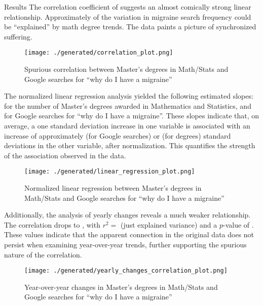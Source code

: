 \documentclass{article}
\begin{document}
\pagebreak

\begin{section}{Results}
 The correlation coefficient of  suggests an almost comically strong linear relationship. Approximately  of the variation in migraine search frequency could be ``explained'' by math degree trends. The data paints a picture of synchronized suffering.

 \begin{figure}[H]
   \centering
   \texttt{[image: ./generated/correlation\_plot.png]}
   \caption{Spurious correlation between Master's degrees in Math/Stats and Google searches for ``why do I have a migraine''}
   \label{fig:correlation}
 \end{figure}

 The normalized linear regression analysis yielded the following estimated slopes:  for the number of Master's degrees awarded in Mathematics and Statistics, and  for Google searches for ``why do I have a migraine''. These slopes indicate that, on average, a one standard deviation increase in one variable is associated with an increase of approximately  (for Google searches) or  (for degrees) standard deviations in the other variable, after normalization. This quantifies the strength of the association observed in the data.

 \begin{figure}[H]
   \centering
   \texttt{[image: ./generated/linear\_regression\_plot.png]}
   \caption{Normalized linear regression between Master's degrees in Math/Stats and Google searches for ``why do I have a migraine''}
   \label{fig:linear_regression}
 \end{figure}

 Additionally, the analysis of yearly changes reveals a much weaker relationship. The correlation drops to , with $r^2 =$  (just  explained variance) and a $p$-value of . These values indicate that the apparent connection in the original data does not persist when examining year-over-year trends, further supporting the spurious nature of the correlation.

 \begin{figure}[H]
   \centering
   \texttt{[image: ./generated/yearly\_changes\_correlation\_plot.png]}
   \caption{Year-over-year changes in Master's degrees in Math/Stats and Google searches for ``why do I have a migraine''}
   \label{fig:yearly_changes}
 \end{figure}

\end{section}
\end{document}
